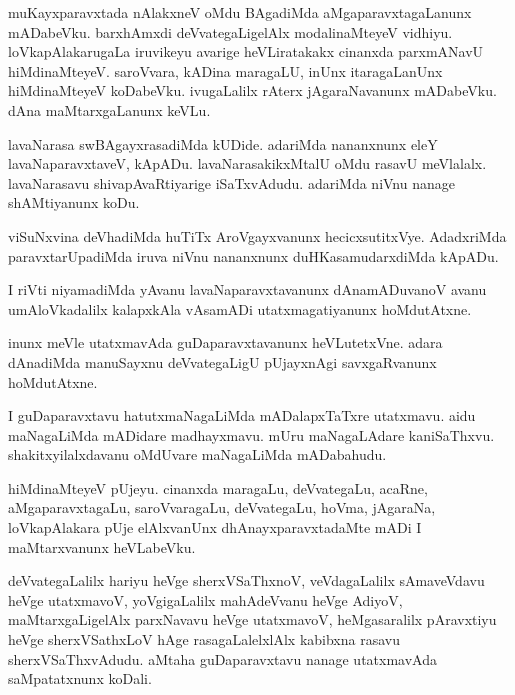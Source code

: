 \documentclass{article}
\begin{document}
\begin{mn}
muKayxparavxtada  nAlakxneV  oMdu  BAgadiMda  aMgaparavxtagaLanunx  mADabeVku.  barxhAmxdi  
deVvategaLigelAlx  modalinaMteyeV  vidhiyu.  loVkapAlakarugaLa  iruvikeyu  avarige  
heVLiratakakx  cinanxda  parxmANavU  hiMdinaMteyeV.  saroVvara,  kADina  maragaLU,  inUnx  
itaragaLanUnx  hiMdinaMteyeV  koDabeVku.  ivugaLalilx  rAterx  jAgaraNavanunx  mADabeVku.  
dAna  maMtarxgaLanunx  keVLu.
\end{mn}

\begin{mn}
lavaNarasa  swBAgayxrasadiMda  kUDide.  adariMda  nananxnunx  eleY  lavaNaparavxtaveV,  
kApADu.  lavaNarasakikxMtalU  oMdu  rasavU  meVlalalx.  lavaNarasavu  shivapAvaRtiyarige  
iSaTxvAdudu.  adariMda  niVnu  nanage  shAMtiyanunx  koDu.
\end{mn}

\begin{mn}
viSuNxvina  deVhadiMda  huTiTx  AroVgayxvanunx  hecicxsutitxVye.  AdadxriMda  paravxtarUpadiMda  
iruva  niVnu  nananxnunx  duHKasamudarxdiMda  kApADu.
\end{mn}

\begin{mn}
I riVti  niyamadiMda  yAvanu  lavaNaparavxtavanunx  dAnamADuvanoV  avanu  umAloVkadalilx  
kalapxkAla  vAsamADi  utatxmagatiyanunx  hoMdutAtxne.
\end{mn}

\begin{mn}
inunx  meVle  utatxmavAda  guDaparavxtavanunx  heVLutetxVne.  adara  dAnadiMda  manuSayxnu  
deVvategaLigU  pUjayxnAgi  savxgaRvanunx  hoMdutAtxne.
\end{mn}

\begin{mn}
I  guDaparavxtavu  hatutxmaNagaLiMda  mADalapxTaTxre  utatxmavu.  aidu  maNagaLiMda  mADidare  
madhayxmavu.  mUru  maNagaLAdare  kaniSaThxvu.  shakitxyilalxdavanu  oMdUvare  maNagaLiMda  mADabahudu.
\end{mn}

\begin{mn}
hiMdinaMteyeV  pUjeyu.  cinanxda  maragaLu,  deVvategaLu,  acaRne,  aMgaparavxtagaLu,  
saroVvaragaLu,  deVvategaLu,  hoVma,  jAgaraNa,  loVkapAlakara  pUje  elAlxvanUnx  
dhAnayxparavxtadaMte  mADi  I  maMtarxvanunx  heVLabeVku.
\end{mn}

\begin{mn}
deVvategaLalilx  hariyu  heVge  sherxVSaThxnoV,  veVdagaLalilx  sAmaveVdavu  heVge  
utatxmavoV,  yoVgigaLalilx  mahAdeVvanu  heVge  AdiyoV,  maMtarxgaLigelAlx  parxNavavu  
heVge  utatxmavoV,  heMgasaralilx  pAravxtiyu  heVge  sherxVSathxLoV  hAge  rasagaLalelxlAlx  
kabibxna  rasavu  sherxVSaThxvAdudu.  aMtaha  guDaparavxtavu  nanage  utatxmavAda  saMpatatxnunx  koDali.
\end{mn}
\end{document}
